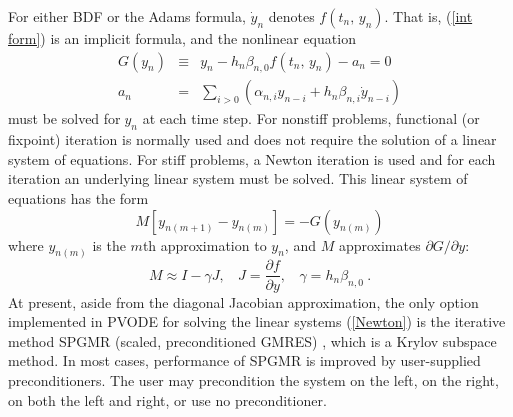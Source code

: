For either BDF or the Adams formula, $\dot{y}_n$ denotes
$f(t_n,\,y_n)$. That is, (\ref{int form}) is an implicit formula, and 
the nonlinear equation 
\begin{eqnarray}
G(y_n) &\equiv & y_n-h_n\beta_{n,0}f(t_n,\,y_n) - a_n=0  \label{nonlinear} \\
a_n &=& \sum_{i>0}(\alpha_{n,i}y_{n-i}+h_n\beta_{n,i}\dot{y}_{n-i}) 
\nonumber
\end{eqnarray}
must be solved for$\;y_{n}$ at each time step. For nonstiff problems,
functional (or fixpoint) iteration is normally used and does not
require the solution of a linear system of equations. For stiff
problems, a Newton iteration is used and for each iteration an
underlying linear system must be solved. This linear system of
equations has the form
\begin{equation}
M[y_{n(m+1)}-y_{n(m)}]=-G(y_{n(m)})  \label{Newton}
\end{equation}
where $y_{n(m)}$ is the $m$th approximation to $y_n$, and $M$
approximates $\partial G/ \partial y$:
\begin{equation}
M \approx I-\gamma J, ~~~~ J = \frac{\partial f}{\partial y}, ~~~~
    \gamma = h_n\beta_{n,0} ~. \label{N_Matrix} 
\end{equation}
At present, aside from the diagonal Jacobian approximation, the only
option implemented in PVODE for solving the linear systems
(\ref{Newton}) is the iterative method SPGMR (scaled, preconditioned
GMRES) \cite{Red-stor}, which is a Krylov subspace method. In most
cases, performance of SPGMR is improved by user-supplied
preconditioners. The user may precondition the system on the left, on
the right, on both the left and right, or use no preconditioner.

